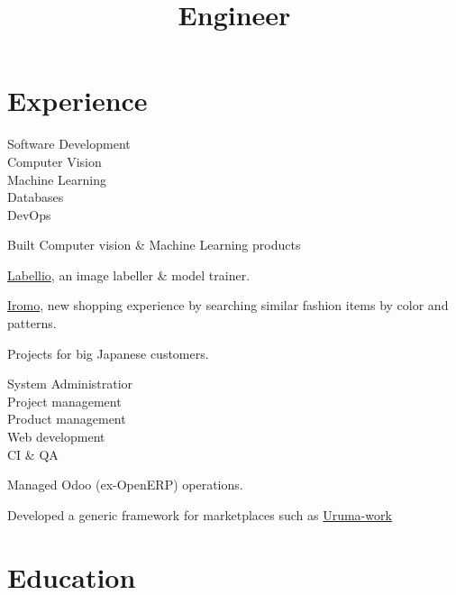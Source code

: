 \documentclass[a4paper,11pt]{cv4tw}%
\title{Engineer}
\begin{document}
\section{Experience}
{Software Development\\Computer Vision\\ Machine Learning\\Databases\\DevOps}
    { Built Computer vision \& Machine Learning products 
	\begin{missions}
    \item \href{http://www.labell.io/}{Labellio}, an image labeller \& model trainer.
        \item \href{http://iromo.jp}{Iromo}, new shopping experience by
            searching similar fashion items by color and patterns.
		\item Projects for big Japanese customers.
	\end{missions}
}
{System Administratior\\Project management\\Product management\\Web development\\CI \& QA}
	{
	\begin{missions}
    \item Managed Odoo (ex-OpenERP) operations.
        \item Developed a generic framework for marketplaces such as \href{https://uruma-work.com}{Uruma-work}
	\end{missions}
}
\section{Education}
\end{document}
